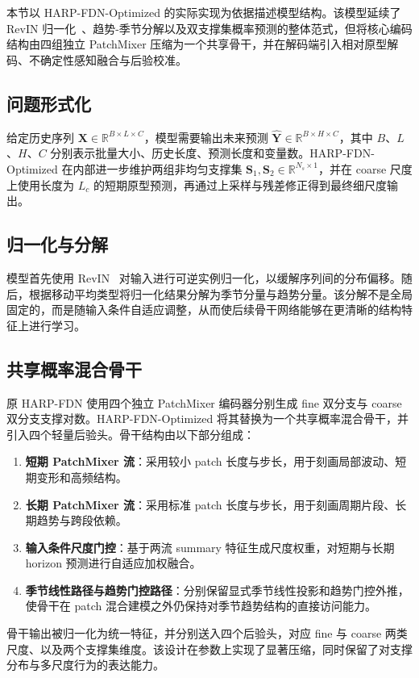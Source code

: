 \documentclass[journal]{IEEEtran}
\begin{document}
本节以 HARP-FDN-Optimized 的实际实现为依据描述模型结构。该模型延续了 RevIN 归一化~\cite{revin}、趋势-季节分解以及双支撑集概率预测的整体范式，但将核心编码结构由四组独立 PatchMixer 压缩为一个共享骨干，并在解码端引入相对原型解码、不确定性感知融合与后验校准。

\subsection{问题形式化}
给定历史序列 $\mathbf{X} \in \mathbb{R}^{B \times L \times C}$，模型需要输出未来预测 $\hat{\mathbf{Y}} \in \mathbb{R}^{B \times H \times C}$，其中 $B$、$L$、$H$、$C$ 分别表示批量大小、历史长度、预测长度和变量数。HARP-FDN-Optimized 在内部进一步维护两组非均匀支撑集 $\mathbf{S}_1, \mathbf{S}_2 \in \mathbb{R}^{N_s \times 1}$，并在 coarse 尺度上使用长度为 $L_c$ 的短期原型预测，再通过上采样与残差修正得到最终细尺度输出。

\subsection{归一化与分解}
模型首先使用 RevIN~\cite{revin} 对输入进行可逆实例归一化，以缓解序列间的分布偏移。随后，根据移动平均类型将归一化结果分解为季节分量与趋势分量。该分解不是全局固定的，而是随输入条件自适应调整，从而使后续骨干网络能够在更清晰的结构特征上进行学习。

\subsection{共享概率混合骨干}
\label{subsec:backbone}
原 HARP-FDN 使用四个独立 PatchMixer 编码器分别生成 fine 双分支与 coarse 双分支支撑对数。HARP-FDN-Optimized 将其替换为一个共享概率混合骨干，并引入四个轻量后验头。骨干结构由以下部分组成：
\begin{enumerate}[leftmargin=*,itemsep=2pt]
  \item \textbf{短期 PatchMixer 流}：采用较小 patch 长度与步长，用于刻画局部波动、短期变形和高频结构。
  \item \textbf{长期 PatchMixer 流}：采用标准 patch 长度与步长，用于刻画周期片段、长期趋势与跨段依赖。
  \item \textbf{输入条件尺度门控}：基于两流 summary 特征生成尺度权重，对短期与长期 horizon 预测进行自适应加权融合。
  \item \textbf{季节线性路径与趋势门控路径}：分别保留显式季节线性投影和趋势门控外推，使骨干在 patch 混合建模之外仍保持对季节趋势结构的直接访问能力。
\end{enumerate}
骨干输出被归一化为统一特征，并分别送入四个后验头，对应 fine 与 coarse 两类尺度、以及两个支撑集维度。该设计在参数上实现了显著压缩，同时保留了对支撑分布与多尺度行为的表达能力。
\end{document}
